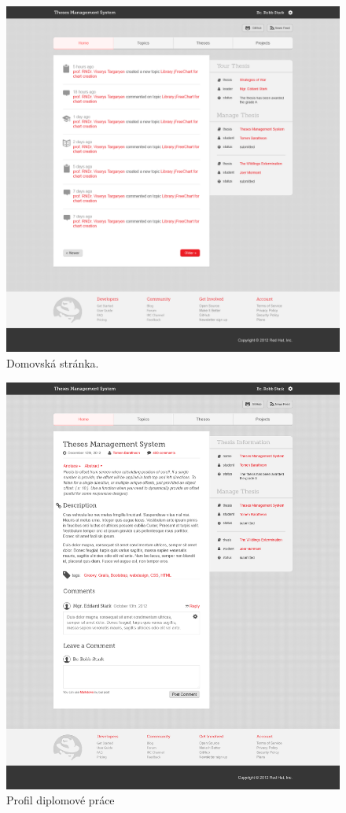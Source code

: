 \begin{figure}[htbp]
    \centering
    \includegraphics[width=\textwidth]{images/gd2.png}
    \caption{Domovská stránka.}
    \label{img:layout1}
\end{figure}

\begin{figure}[htbp]
    \centering
    \includegraphics[width=\textwidth]{images/gd1.png}
    \caption{Profil diplomové práce}
    \label{img:layout1}
\end{figure}

